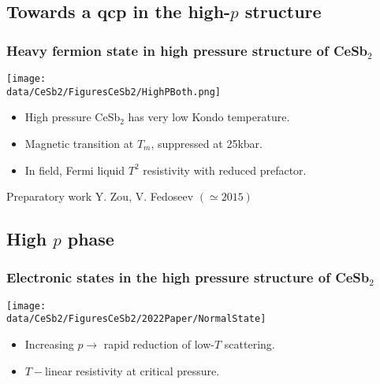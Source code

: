\subsection{Towards a qcp in the high-$p$ structure}
\begin{frame}[label=CeSb2HighestP]
\frametitle{Heavy fermion state in high pressure structure of CeSb$_2$}


\centerline{\texttt{[image: \\data/CeSb2/FiguresCeSb2/HighPBoth.png]}}

\begin{itemize}
\item
High pressure CeSb$_2$ has very low Kondo temperature.

\item
Magnetic transition at $T_m$, suppressed at 25kbar.

\item
In field, Fermi liquid $T^2$ resistivity with reduced prefactor.

\end{itemize}
\vspace{0em}
\centerline{\makebox[\linewidth]{\rule{0.85\textwidth}{0.4pt}}}

\centerline{\scriptsize Preparatory work Y. Zou, V. Fedoseev $(\simeq 2015)$}

\end{frame}

\subsection{High $p$ phase}

\begin{frame}[label=NormalState]
\frametitle{Electronic states in the high pressure structure of CeSb$_2$}

\centerline{\texttt{[image: \\data/CeSb2/FiguresCeSb2/2022Paper/NormalState]}}

\begin{itemize}
\item Increasing $p \rightarrow$ rapid reduction of low-$T$ scattering. %
\item $T-$linear resistivity at critical pressure.

\end{itemize}


\end{frame}



